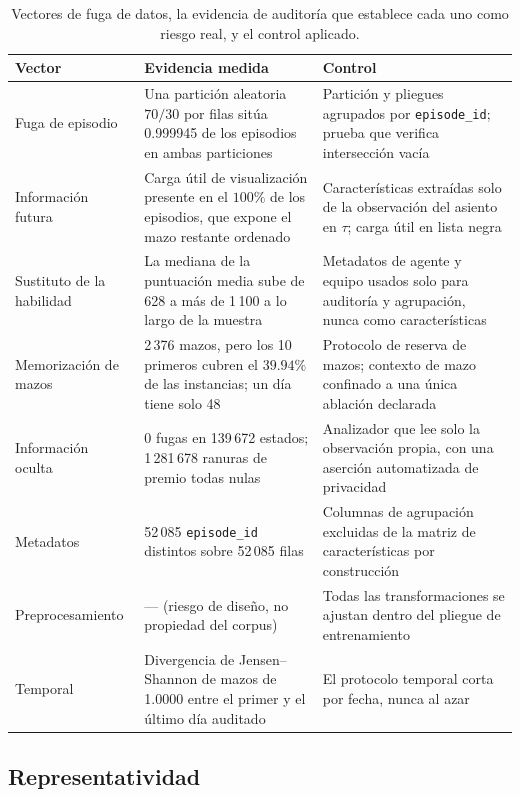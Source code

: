\documentclass[conference]{IEEEtran}
\newcommand{\code}[1]{\texttt{#1}}
\begin{document}
\begin{table}[!t]
\centering
\caption{Vectores de fuga de datos, la evidencia de auditor\'ia que
establece cada uno como riesgo real, y el control aplicado.}
\label{tab:leakage}
\footnotesize
\begin{tabularx}{\columnwidth}{@{}P{1.55cm} P{2.35cm} Y@{}}
\toprule
\textbf{Vector} & \textbf{Evidencia medida} & \textbf{Control}\\
\midrule
Fuga de episodio &
Una partici\'on aleatoria $70/30$ por filas sit\'ua 0.999945 de los
episodios en ambas particiones &
Partici\'on y pliegues agrupados por \code{episode\_id}; prueba que verifica
intersecci\'on vac\'ia\\
Informaci\'on futura &
Carga \'util de visualizaci\'on presente en el $100\%$ de los episodios,
que expone el mazo restante ordenado &
Caracter\'isticas extra\'idas solo de la observaci\'on del asiento en
$\tau$; carga \'util en lista negra\\
Sustituto de la habilidad &
La mediana de la puntuaci\'on media sube de 628 a m\'as de 1\,100 a lo largo
de la muestra &
Metadatos de agente y equipo usados solo para auditor\'ia y agrupaci\'on,
nunca como caracter\'isticas\\
Memorizaci\'on de mazos &
2\,376 mazos, pero los 10 primeros cubren el $39.94\%$ de las
instancias; un d\'ia tiene solo 48 &
Protocolo de reserva de mazos; contexto de mazo confinado a una \'unica
ablaci\'on declarada\\
Informaci\'on oculta &
$0$ fugas en 139\,672 estados; 1\,281\,678 ranuras de premio todas nulas &
Analizador que lee solo la observaci\'on propia, con una aserci\'on
automatizada de privacidad\\
Metadatos &
52\,085 \code{episode\_id} distintos sobre 52\,085 filas &
Columnas de agrupaci\'on excluidas de la matriz de caracter\'isticas por
construcci\'on\\
Preprocesamiento &
--- (riesgo de dise\~no, no propiedad del corpus) &
Todas las transformaciones se ajustan dentro del pliegue de
entrenamiento~\cite{sasse_leakage_2025}\\
Temporal &
Divergencia de Jensen--Shannon de mazos de 1.0000 entre el primer y el
\'ultimo d\'ia auditado &
El protocolo temporal corta por fecha, nunca al
azar~\cite{kaufman_leakage_2011}\\
\bottomrule
\end{tabularx}
\end{table}

\subsection{Representatividad}
\label{subsec:representativeness}
\end{document}
